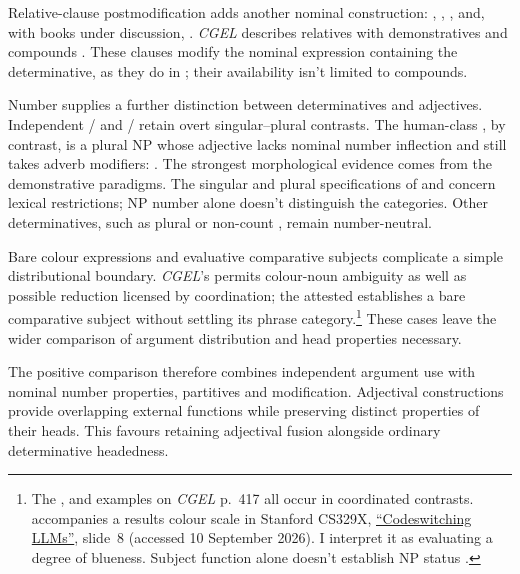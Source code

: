 \documentclass[12pt]{article}
\begin{document}
Relative-clause postmodification adds another nominal construction: , , , and, with books under discussion, . \textit{CGEL} describes relatives with demonstratives and compounds \citep[414, 422--423]{huddleston2002}. These clauses modify the nominal expression containing the determinative, as they do in ; their availability isn't limited to compounds.

Number supplies a further distinction between determinatives and adjectives. Independent /\allowbreak{} and /\allowbreak{} retain overt singular--plural contrasts. The human-class , by contrast, is a plural NP whose adjective lacks nominal number inflection and still takes adverb modifiers:  \citep[418]{huddleston2002}. The strongest morphological evidence comes from the demonstrative paradigms. The singular and plural specifications of  and  concern lexical restrictions; NP number alone doesn't distinguish the categories. Other determinatives, such as plural or non-count , remain number-neutral.

Bare colour expressions and evaluative comparative subjects complicate a simple distributional boundary. \textit{CGEL}'s  permits colour-noun ambiguity as well as possible reduction licensed by coordination; the attested  establishes a bare comparative subject without settling its phrase category.\footnote{The ,  and  examples on \textit{CGEL} p.~417 all occur in coordinated contrasts.  accompanies a results colour scale in Stanford CS329X, \href{https://web.stanford.edu/class/cs329x/slides/Lecture12_B_Codeswitching\%20LLMs.pdf}{\enquote{Codeswitching LLMs}}, slide~8 (accessed 10 September 2026). I interpret it as evaluating a degree of blueness. Subject function alone doesn't establish NP status \citep[236]{huddleston2002}.} These cases leave the wider comparison of argument distribution and head properties necessary.

The positive comparison therefore combines independent argument use with nominal number properties, partitives and modification. Adjectival constructions provide overlapping external functions while preserving distinct properties of their heads. This favours retaining adjectival fusion alongside ordinary determinative headedness.
\end{document}
